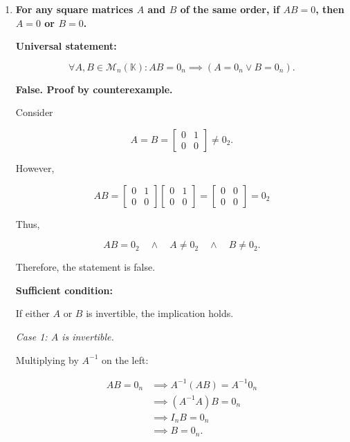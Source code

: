 \begin{enumerate}[label=\alph*)]
\begin{answer}
    Hence, all corresponding entries
    are equal, so

    $$
    \boxed{AB=BA}.
    $$
\end{answer}


\item {\bfseries\boldmath
    For any square matrices $A$ and $B$
    of the same order, if $AB=0$,
    then $A=0$ or $B=0$.
}

\begin{answer}
    \textbf{Universal statement:}

    $$
    \forall A,B\in\mathcal{M}_n(\mathbb{K}):
    AB=0_n\implies
    (A=0_n\lor B=0_n).
    $$

    \textbf{False. Proof by counterexample.}

    Consider

    $$
    A=B=\begin{bmatrix}
        0 & 1 \\
        0 & 0
    \end{bmatrix}
    \neq0_2.
    $$

    However,

    $$
    AB=\begin{bmatrix}
        0 & 1 \\
        0 & 0
    \end{bmatrix}
    \begin{bmatrix}
        0 & 1 \\
        0 & 0
    \end{bmatrix} =\begin{bmatrix}
        0 & 0 \\
        0 & 0
    \end{bmatrix}=0_2
    $$

    Thus,

    $$
    AB=0_2
    \quad\land\quad
    A\neq0_2
    \quad\land\quad
    B\neq0_2.
    $$

    Therefore, the statement is false.

    \par\bigskip
    \noindent\textbf{Sufficient condition:}

    If either $A$ or $B$ is invertible,
    the implication holds.

    \par\smallskip
    \noindent\textit{Case 1: $A$ is invertible.}

    Multiplying by $A^{-1}$ on the left:

    $$
    \begin{aligned}
        AB=0_n
        &\implies A^{-1}(AB)=A^{-1}0_n \\
        &\implies (A^{-1}A)B=0_n \\
        &\implies I_nB=0_n \\
        &\implies \boxed{B=0_n}.
    \end{aligned}
    $$


\end{answer}
\end{enumerate}
